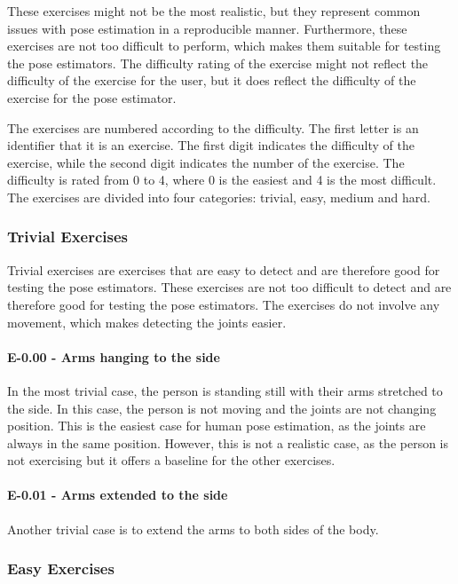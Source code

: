 These exercises might not be the most realistic, but they represent common issues with pose estimation in a reproducible manner. Furthermore, these exercises are not too difficult to perform, which makes them suitable for testing the pose estimators. The difficulty rating of the exercise might not reflect the difficulty of the exercise for the user, but it does reflect the difficulty of the exercise for the pose estimator.

The exercises are numbered according to the difficulty. The first letter is an identifier that it is an exercise. The first digit indicates the difficulty of the exercise, while the second digit indicates the number of the exercise. The difficulty is rated from 0 to 4, where 0 is the easiest and 4 is the most difficult. The exercises are divided into four categories: trivial, easy, medium and hard.

\subsubsection{Trivial Exercises}

Trivial exercises are exercises that are easy to detect and are therefore good for testing the pose estimators. These exercises are not too difficult to detect and are therefore good for testing the pose estimators. The exercises do not involve any movement, which makes detecting the joints easier. 

\paragraph{E-0.00 - Arms hanging to the side}

In the most trivial case, the person is standing still with their arms stretched to the side. In this case, the person is not moving and the joints are not changing position. This is the easiest case for human pose estimation, as the joints are always in the same position. However, this is not a realistic case, as the person is not exercising but it offers a baseline for the other exercises.

\paragraph{E-0.01 - Arms extended to the side}

Another trivial case is to extend the arms to both sides of the body.  

\subsubsection{Easy Exercises}

